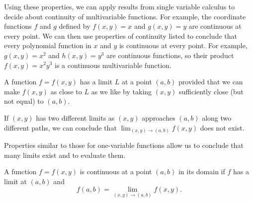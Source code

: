 \vspace*{5pt}
\nin {}
\vspace*{5pt}

Using these properties, we can apply results from single variable calculus
to decide about continuity of multivariable functions. For example, the coordinate functions $f$ and $g$ defined by $f(x,y) = x$ and $g(x,y) = y$ are continuous at every point. We can then use properties of continuity listed to conclude that every polynomial function in $x$ and $y$ is continuous at every point. For example, $g(x,y)=x^2$ and $h(x,y)=y^3$ are continuous functions, so their product $f(x,y) = x^2y^3$ is a continuous multivariable function. 


\begin{summary}
\item A function $f = f(x,y)$ has a limit $L$ at a point $(a,b)$ provided that we
  can make $f(x,y)$ as close to $L$ as we like by taking $(x,y)$
  sufficiently close (but not equal) to $(a,b)$.  
\item If $(x,y)$ has two different limits as $(x,y)$ approaches
  $(a,b)$ along two different paths, we can conclude that
  $\lim_{(x,y)\to(a,b)}f(x,y)$ does not exist.
\item Properties similar to those for one-variable functions allow us
  to conclude that many limits exist and to evaluate them.
\item A function $f = f(x,y)$ is continuous at a point $(a,b)$ in its
  domain if $f$ has a limit at $(a,b)$ and 
\[f(a,b) = \lim_{(x,y) \to (a,b)} f(x,y).\] 
\end{summary}



\nin \hrulefill



\clearpage
